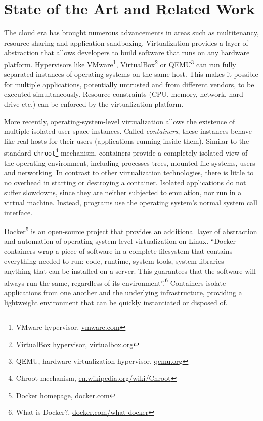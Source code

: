 \chapter{State of the Art and Related Work}
\label{chapter:sata-and-rw}

The cloud era has brought numerous advancements in areas such as multitenancy, resource sharing and application sandboxing. Virtualization provides a layer of abstraction that allows developers to build software that runs on any hardware platform. Hypervisors like VMware\footnote{VMware hypervisor, \url{vmware.com}}, VirtualBox\footnote{VirtualBox hypervisor, \url{virtualbox.org}} or QEMU\footnote{QEMU, hardware virtualization hypervisor, \url{qemu.org}} can run fully separated instances of operating systems on the same host. This makes it possible for multiple applications, potentially untrusted and from different vendors, to be executed simultaneously. Resource constraints (CPU, memory, network, hard-drive etc.) can be enforced by the virtualization platform.

More recently, operating-system-level virtualization allows the existence of multiple isolated user-space instances. Called \textit{containers}, these instances behave like real hosts for their users (applications running inside them). Similar to the standard \texttt{chroot}\footnote{Chroot mechanism, \url{en.wikipedia.org/wiki/Chroot}} mechanism, containers provide a completely isolated view of the operating environment, including processes trees, mounted file systems, users and networking. In contrast to other virtualization technologies, there is little to no overhead in starting or destroying a container. Isolated applications do not suffer slowdowns, since they are neither subjected to emulation, nor run in a virtual machine. Instead, programs use the operating system's normal system call interface.

Docker\footnote{Docker homepage, \url{docker.com}} is an open-source project that provides an additional layer of abstraction and automation of operating-system-level virtualization on Linux. ``Docker containers wrap a piece of software in a complete filesystem that contains everything needed to run: code, runtime, system tools, system libraries -- anything that can be installed on a server. This guarantees that the software will always run the same, regardless of its environment''.\footnote{What is Docker?, \url{docker.com/what-docker}} Containers isolate applications from one another and the underlying infrastructure, providing a lightweight environment that can be quickly instantiated or disposed of.

